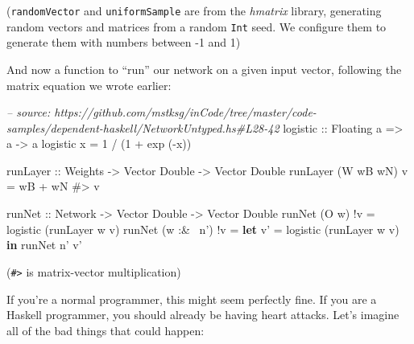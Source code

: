 \documentclass[]{article}
\newenvironment{Shaded}{}{}
\newcommand{\KeywordTok}[1]{\textcolor[rgb]{0.00,0.44,0.13}{\textbf{{#1}}}}
\newcommand{\DataTypeTok}[1]{\textcolor[rgb]{0.56,0.13,0.00}{{#1}}}
\newcommand{\DecValTok}[1]{\textcolor[rgb]{0.25,0.63,0.44}{{#1}}}
\newcommand{\CommentTok}[1]{\textcolor[rgb]{0.38,0.63,0.69}{\textit{{#1}}}}
\newcommand{\OtherTok}[1]{\textcolor[rgb]{0.00,0.44,0.13}{{#1}}}
\newcommand{\FunctionTok}[1]{\textcolor[rgb]{0.02,0.16,0.49}{{#1}}}
\newcommand{\NormalTok}[1]{{#1}}
\begin{document}
(\texttt{randomVector} and \texttt{uniformSample} are from the
\emph{hmatrix} library, generating random vectors and matrices from a
random \texttt{Int} seed. We configure them to generate them with
numbers between -1 and 1)

And now a function to ``run'' our network on a given input vector,
following the matrix equation we wrote earlier:

\begin{Shaded}
\begin{Highlighting}[]
\CommentTok{-- source: https://github.com/mstksg/inCode/tree/master/code-samples/dependent-haskell/NetworkUntyped.hs#L28-42}
\OtherTok{logistic ::} \DataTypeTok{Floating} \NormalTok{a }\OtherTok{=>} \NormalTok{a }\OtherTok{->} \NormalTok{a}
\NormalTok{logistic x }\FunctionTok{=} \DecValTok{1} \FunctionTok{/} \NormalTok{(}\DecValTok{1} \FunctionTok{+} \NormalTok{exp (}\FunctionTok{-}\NormalTok{x))}

\OtherTok{runLayer ::} \DataTypeTok{Weights} \OtherTok{->} \DataTypeTok{Vector} \DataTypeTok{Double} \OtherTok{->} \DataTypeTok{Vector} \DataTypeTok{Double}
\NormalTok{runLayer (}\DataTypeTok{W} \NormalTok{wB wN) v }\FunctionTok{=} \NormalTok{wB }\FunctionTok{+} \NormalTok{wN }\FunctionTok{#>} \NormalTok{v}

\OtherTok{runNet ::} \DataTypeTok{Network} \OtherTok{->} \DataTypeTok{Vector} \DataTypeTok{Double} \OtherTok{->} \DataTypeTok{Vector} \DataTypeTok{Double}
\NormalTok{runNet (}\DataTypeTok{O} \NormalTok{w)      }\FunctionTok{!}\NormalTok{v }\FunctionTok{=} \NormalTok{logistic (runLayer w v)}
\NormalTok{runNet (w }\FunctionTok{:&~} \NormalTok{n') }\FunctionTok{!}\NormalTok{v }\FunctionTok{=} \KeywordTok{let} \NormalTok{v' }\FunctionTok{=} \NormalTok{logistic (runLayer w v)}
                       \KeywordTok{in}  \NormalTok{runNet n' v'}
\end{Highlighting}
\end{Shaded}

(\texttt{\#\textgreater{}} is matrix-vector multiplication)

If you're a normal programmer, this might seem perfectly fine. If you
are a Haskell programmer, you should already be having heart attacks.
Let's imagine all of the bad things that could happen:
\end{document}
